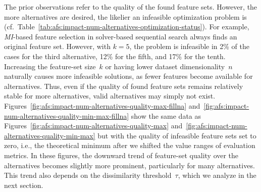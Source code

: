 \documentclass{article}
\theoremstyle{definition}
\begin{document}
The prior observations refer to the quality of the found feature sets.
However, the more alternatives are desired, the likelier an infeasible optimization problem is (cf.~Table~\ref{tab:afs:impact-num-alternatives-optimization-status}).
For example, \emph{MI}-based feature selection in solver-based sequential search always finds an original feature set.
However, with $k=5$, the problem is infeasible in 2\% of the cases for the third alternative, 12\% for the fifth, and 17\% for the tenth.
Increasing the feature-set size~$k$ or having lower dataset dimensionality~$n$ naturally causes more infeasible solutions, as fewer features become available for alternatives.
Thus, even if the quality of found feature sets remains relatively stable for more alternatives, valid alternatives may simply not exist.
Figures~\ref{fig:afs:impact-num-alternatives-quality-max-fillna} and~\ref{fig:afs:impact-num-alternatives-quality-min-max-fillna} show the same data as Figures~\ref{fig:afs:impact-num-alternatives-quality-max} and~\ref{fig:afs:impact-num-alternatives-quality-min-max} but with the quality of infeasible feature sets set to zero, i.e., the theoretical minimum after we shifted the value ranges of evaluation metrics.
In these figures, the downward trend of feature-set quality over the alternatives becomes slightly more prominent, particularly for many alternatives.
This trend also depends on the dissimilarity threshold~$\tau$, which we analyze in the next section.
\end{document}
